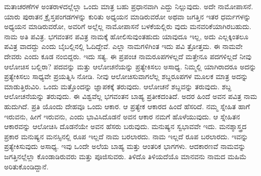 ಮತಾಚರಣೆಗಳ ಅಂತರಾಳದಲ್ಲೆಲ್ಲಾ ಒಂದು ಮಾತ್ರ ಬಹು ಪ್ರಧಾನವಾಗಿ ಎದ್ದು ನಿಲ್ಲುವುದು. ಅದೇ ನಾಮೋಪಾಸನೆ. ಯಾರು ಪುರಾತನ ಕ್ರೈಸ್ತಪಂಗಡಗಳನ್ನು ಕುರಿತು ಅಧ್ಯಯನ ಮಾಡಿರುವರೋ ಅಥವಾ ಜಗತ್ತಿನ ಇತರ ಧರ್ಮಗಳನ್ನು ಅಧ್ಯಯನ ಮಾಡಿರುವರೋ, ಅವರಿಗೆ ಅಲ್ಲೆಲ್ಲ ನಾಮೋಪಾಸನೆ ಬಳಕೆಯಲ್ಲಿರು ವುದು ಮನವರಿಕೆಯಾಗಿರಬಹುದು. ನಾಮ ಅತಿ ಪವಿತ್ರ. ಭಗವಂತನ ಪವಿತ್ರ ನಾಮಕ್ಕೆ ಹೋಲಿಸುವುಂತಹುದು ಯಾವುದೂ ಇಲ್ಲ, ಅದು ಎಲ್ಲಕ್ಕಿಂತಲೂ ಪವಿತ್ರ ವಾದದ್ದು ಎಂದು ಬೈಬಲ್ಲಿನಲ್ಲಿ ಓದಿದ್ದೇವೆ. ಎಲ್ಲಾ ನಾಮಗಳಿಗಿಂತ ಇದು ಪವಿ ತ್ರೋತ್ತಮ. ಈ ನಾಮವೇ ದೇವರು ಎಂದು ಕೂಡ ನಂಬಿದ್ದರು. ಇದು ಸತ್ಯ. ಈ ಪ್ರಪಂಚ ನಾಮರೂಪಗಳಲ್ಲದೆ ಮತ್ತೇನೂ ಪದಗಳಿಲ್ಲದೆ ನೀವು ಆಲೋಚಿಸ ಬಲ್ಲಿರಾ? ಪದವನ್ನು ಮತ್ತು ಆಲೋಚನೆಯನ್ನು ಪ್ರತ್ಯೇಕಿಸಲು ಅಸಾಧ್ಯ. ನಿಮ್ಮಲ್ಲಿ ಯಾಗಿರಾದರೂ ಅದನ್ನು ಪ್ರತ್ಯೇಕಿಸಲು ಸಾಧ್ಯವೇ ಪ್ರಯತ್ನಿಸಿ ನೋಡಿ. ನೀವು ಆಲೋಚಿಸುವಾಗಲೆಲ್ಲ ಶಬ್ದರೂಪಗಳ ಮೂಲಕ ಮಾತ್ರ ಅದನ್ನು ಮಾಡುತ್ತಿರುವಿರಿ. ಒಂದು ಮತ್ತೊಂದನ್ನು ಜ್ಞಾಪಕಕ್ಕೆ ತರುವುದು. ಆಲೋಚನೆ ಶಬ್ದವನ್ನು ತರುವುದು. ಶಬ್ದ ಆಲೋಚನೆಯನ್ನು ತರುವುದು. ಈ ವಿಶ್ವವೆಲ್ಲ ಭಗವಂತನ ಬಾಹ್ಯ ಪ್ರತೀಕದಂತಿದೆ. ಅದರ ಹಿಂದೆ ಅವನ ಪವಿತ್ರ ನಾಮ ಹುದುಗಿದೆ. ಪ್ರತಿ ಯೊಂದು ದೇಹವೂ ಒಂದು ಆಕಾರ. ಆ ಪ್ರತ್ಯೇಕ ಆಕಾರದ ಹಿಂದೆ ಹೆಸರಿದೆ. ನಮ್ಮ ಸ್ನೇಹಿತ ಹಾಗೆ ಇರುವನು, ಹೀಗೆ ಇರುವನು, ಎಂದು ಭಾವಿಸಿದೊಡನೆ ಅವನ ಆಕಾರ ನಮಗೆ ಹೊಳೆಯುವುದು. ಆ ಸ್ನೇಹಿತನ ಆಕಾರವನ್ನು ಆಲೋಚಿಸಿ ದೊಡನೆಯೇ ಅವನ ಹೆಸರು ಬರುವುದು. ಮನುಷ್ಯನ ಸ್ವಭಾವವೇ ಇದು. ಮನಶ್ಶಾಸ್ತ್ರದ ಪ್ರಕಾರ ಮನುಷ್ಯನ ಮನಸ್ಸಿನಲ್ಲಿ ರೂಪ ಇಲ್ಲದೆ ನಾಮ ಬರಲಾರದು. ನಾಮ ಇಲ್ಲದೆ ರೂಪ ಬರಲಾರದು. ಇವನ್ನು ಪ್ರತ್ಯೇಕಿಸುವುದು ಅಸಾಧ್ಯ. ಇವು ಒಂದೇ ಅಲೆಯ ಬಾಹ್ಯ ಮತ್ತು ಆಂತರಿಕ ಭಾಗಗಳು. ಆದಕಾರಣವೆ ನಾಮವನ್ನು ಜಗತ್ತಿನಲ್ಲೆಲ್ಲಾ ಕೊಂಡಾಡಿರುವರು ಮತ್ತು ಪೂಜಿಸುವರು. ತಿಳಿದೊ ತಿಳಿಯದೆಯೊ ಮಾನವನು ನಾಮದ ಮಹಿಮೆ ಅರಿತುಕೊಂಡಿದ್ದಾನೆ.

